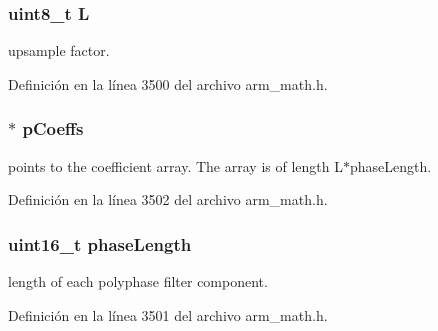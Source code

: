 \subsubsection[{\texorpdfstring{L}{L}}]{\setlength{\rightskip}{0pt plus 5cm}uint8\+\_\+t L}\hypertarget{structarm__fir__interpolate__instance__q15_aee73cc056696e504430c53eaa9c58cf0}{}\label{structarm__fir__interpolate__instance__q15_aee73cc056696e504430c53eaa9c58cf0}
upsample factor. 

Definición en la línea 3500 del archivo arm\+\_\+math.\+h.

\subsubsection[{\texorpdfstring{p\+Coeffs}{pCoeffs}}]{$\ast$ p\+Coeffs}\hypertarget{structarm__fir__interpolate__instance__q15_a7ca181a37f714d174445f486bebce26f}{}\label{structarm__fir__interpolate__instance__q15_a7ca181a37f714d174445f486bebce26f}
points to the coefficient array. The array is of length L$\ast$phase\+Length. 

Definición en la línea 3502 del archivo arm\+\_\+math.\+h.

\subsubsection[{\texorpdfstring{phase\+Length}{phaseLength}}]{\setlength{\rightskip}{0pt plus 5cm}uint16\+\_\+t phase\+Length}\hypertarget{structarm__fir__interpolate__instance__q15_a8f92bb07e0812f94679438cdf412b26a}{}\label{structarm__fir__interpolate__instance__q15_a8f92bb07e0812f94679438cdf412b26a}
length of each polyphase filter component. 

Definición en la línea 3501 del archivo arm\+\_\+math.\+h.

